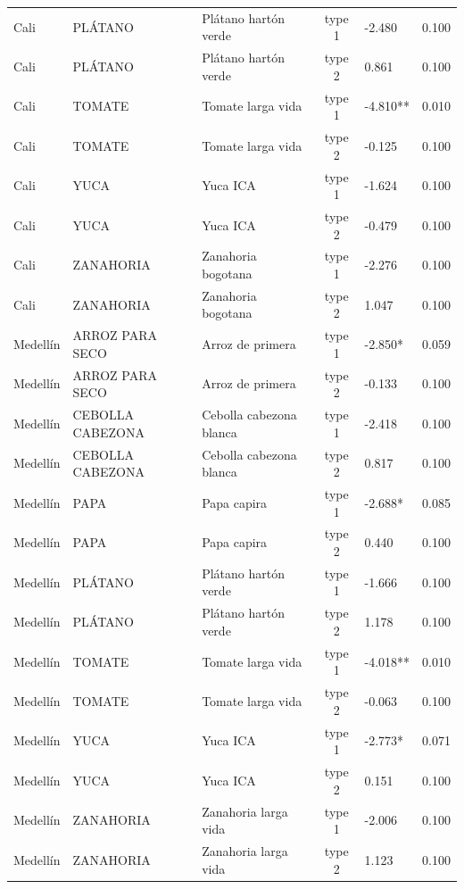 \documentclass[
  12pt,
]{article}
\begin{document}
\begin{longtable}[t]{lllclc}
\addlinespace
Cali & PLÁTANO & Plátano hartón verde & type 1 & -2.480 & 0.100\\
Cali & PLÁTANO & Plátano hartón verde & type 2 & 0.861 & 0.100\\
Cali & TOMATE & Tomate larga vida & type 1 & -4.810** & 0.010\\
Cali & TOMATE & Tomate larga vida & type 2 & -0.125 & 0.100\\
Cali & YUCA & Yuca ICA & type 1 & -1.624 & 0.100\\
\addlinespace
Cali & YUCA & Yuca ICA & type 2 & -0.479 & 0.100\\
Cali & ZANAHORIA & Zanahoria bogotana & type 1 & -2.276 & 0.100\\
Cali & ZANAHORIA & Zanahoria bogotana & type 2 & 1.047 & 0.100\\
Medellín & ARROZ PARA SECO & Arroz de primera & type 1 & -2.850* & 0.059\\
Medellín & ARROZ PARA SECO & Arroz de primera & type 2 & -0.133 & 0.100\\
\addlinespace
Medellín & CEBOLLA CABEZONA & Cebolla cabezona blanca & type 1 & -2.418 & 0.100\\
Medellín & CEBOLLA CABEZONA & Cebolla cabezona blanca & type 2 & 0.817 & 0.100\\
Medellín & PAPA & Papa capira & type 1 & -2.688* & 0.085\\
Medellín & PAPA & Papa capira & type 2 & 0.440 & 0.100\\
Medellín & PLÁTANO & Plátano hartón verde & type 1 & -1.666 & 0.100\\
\addlinespace
Medellín & PLÁTANO & Plátano hartón verde & type 2 & 1.178 & 0.100\\
Medellín & TOMATE & Tomate larga vida & type 1 & -4.018** & 0.010\\
Medellín & TOMATE & Tomate larga vida & type 2 & -0.063 & 0.100\\
Medellín & YUCA & Yuca ICA & type 1 & -2.773* & 0.071\\
Medellín & YUCA & Yuca ICA & type 2 & 0.151 & 0.100\\
\addlinespace
Medellín & ZANAHORIA & Zanahoria larga vida & type 1 & -2.006 & 0.100\\
Medellín & ZANAHORIA & Zanahoria larga vida & type 2 & 1.123 & 0.100\\
\bottomrule
\end{longtable}
\endgroup{}

\begingroup\fontsize{9}{11}\selectfont
\end{document}
